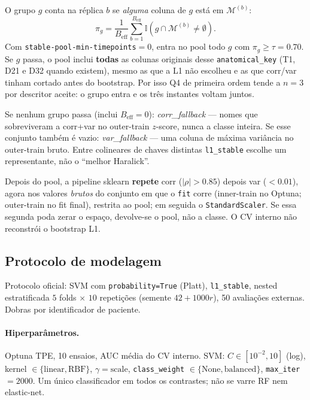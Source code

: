 \documentclass[review]{elsarticle}
\newcommand{\code}[1]{\texttt{#1}}
\begin{document}
O grupo $g$ conta na réplica $b$ se \emph{alguma} coluna de $g$ está em $\mathcal{M}^{(b)}$:
\begin{equation}
\pi_g = \frac{1}{B_{\mathrm{eff}}}\sum_{b=1}^{B_{\mathrm{eff}}} \mathbb{I}\!\left(g\cap\mathcal{M}^{(b)}\ne\emptyset\right).
\label{eq:stability-freq}
\end{equation}
Com \code{stable-pool-min-timepoints}$=0$, entra no pool todo $g$ com $\pi_g\ge\tau=0.70$.
Se $g$ passa, o pool inclui \textbf{todas} as colunas originais desse \code{anatomical\_key} (T1, D21 e D32 quando existem), mesmo as que a L1 não escolheu e as que corr/var tinham cortado antes do bootstrap.
Por isso Q4 de primeira ordem tende a $n=3$ por descritor aceite: o grupo entra e os três instantes voltam juntos.

Se nenhum grupo passa (inclui $B_{\mathrm{eff}}=0$): \emph{corr\_fallback} --- nomes que sobreviveram a corr+var no outer-train $z$-score, nunca a classe inteira.
Se esse conjunto também é vazio: \emph{var\_fallback} --- uma coluna de máxima variância no outer-train bruto.
Entre colineares de chaves distintas \code{l1\_stable} escolhe um representante, não o ``melhor Haralick''.

Depois do pool, a pipeline sklearn \textbf{repete} corr ($|\rho|>0.85$) depois var ($<0.01$), agora nos valores \emph{brutos} do conjunto em que o \code{fit} corre (inner-train no Optuna; outer-train no fit final), restrita ao pool; em seguida o \code{StandardScaler}.
Se essa segunda poda zerar o espaço, devolve-se o pool, não a classe.
O CV interno não reconstrói o bootstrap L1.

\subsection{Protocolo de modelagem}
\label{sec:protocolo-oficial}

Protocolo oficial: SVM com \code{probability=True} (Platt), \code{l1\_stable}, nested estratificada $5$ folds $\times$ $10$ repetições (semente $42+1000r$), 50 avaliações externas.
Dobras por identificador de paciente.

\paragraph{Hiperparâmetros.}
Optuna TPE, 10 ensaios, AUC média do CV interno.
SVM: $C\in[10^{-2},10]$ (log), kernel $\in\{\mathrm{linear},\mathrm{RBF}\}$, $\gamma=\mathrm{scale}$, \code{class\_weight} $\in\{\mathrm{None},\mathrm{balanced}\}$, \code{max\_iter}$=2000$.
Um único classificador em todos os contrastes; não se varre RF nem elastic-net.
\end{document}
